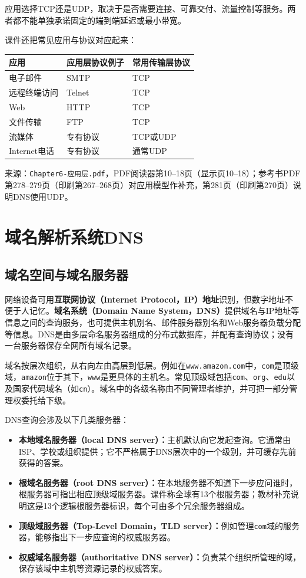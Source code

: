应用选择TCP还是UDP，取决于是否需要连接、可靠交付、流量控制等服务。两者都不能单独承诺固定的端到端延迟或最小带宽。

课件还把常见应用与协议对应起来：
\begin{center}\begin{tabularx}{.96\textwidth}{l l l}
\toprule 应用 & 应用层协议例子 & 常用传输层协议 \\
\midrule
电子邮件 & SMTP & TCP \\
远程终端访问 & Telnet & TCP \\
Web & HTTP & TCP \\
文件传输 & FTP & TCP \\
流媒体 & 专有协议 & TCP或UDP \\
Internet电话 & 专有协议 & 通常UDP \\
\bottomrule
\end{tabularx}\end{center}

\annotationarea[4]
\small 来源：\texttt{Chapter6-应用层.pdf}，PDF阅读器第10--18页（显示页10--18）；参考书PDF第278--279页（印刷第267--268页）对应用模型作补充，第281页（印刷第270页）说明DNS使用UDP。\normalsize

\section{域名解析系统DNS}
\subsection{域名空间与域名服务器}
网络设备可用\textbf{互联网协议（Internet Protocol，IP）地址}识别，但数字地址不便于人记忆。\textbf{域名系统（Domain Name System，DNS）}提供域名与IP地址等信息之间的查询服务，也可提供主机别名、邮件服务器别名和Web服务器负载分配等信息。DNS是由多层命名服务器组成的分布式数据库，并配有查询协议；没有一台服务器保存全网所有域名记录。

域名按层次组织，从右向左由高层到低层。例如在\texttt{www.amazon.com}中，\texttt{com}是顶级域，\texttt{amazon}位于其下，\texttt{www}是更具体的主机名。常见顶级域包括\texttt{com}、\texttt{org}、\texttt{edu}以及国家代码域名（如\texttt{cn}）。域名中的各级名称由不同管理者维护，并可把一部分管理权委托给下级。

DNS查询会涉及以下几类服务器：
\begin{itemize}[nosep]
\item \textbf{本地域名服务器（local DNS server）：}主机默认向它发起查询。它通常由ISP、学校或组织提供；它不严格属于DNS层次中的一个级别，并可缓存先前获得的答案。
\item \textbf{根域名服务器（root DNS server）：}在本地服务器不知道下一步应问谁时，根服务器可指出相应顶级域服务器。课件称全球有13个根服务器；教材补充说明这是13个逻辑根服务器标识，每个可由多个冗余服务器组成。
\item \textbf{顶级域服务器（Top-Level Domain，TLD server）：}例如管理\texttt{com}域的服务器，能够指出下一步应查询的权威服务器。
\item \textbf{权威域名服务器（authoritative DNS server）：}负责某个组织所管理的域，保存该域中主机等资源记录的权威答案。
\end{itemize}

